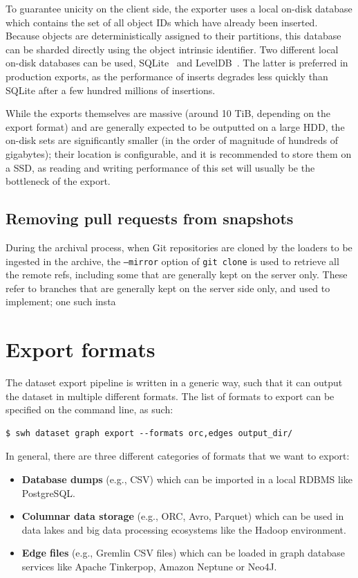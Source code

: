To guarantee unicity on the client side, the exporter uses a local on-disk
database which contains the set of all object IDs which have already been
inserted. Because objects are deterministically assigned to their partitions,
this database can be sharded directly using the object intrinsic identifier.
Two different local on-disk databases can be used,
SQLite~\cite{owens2006sqlitebook} and LevelDB~\cite{ghemawat2011leveldb}. The
latter is preferred in production exports, as the performance of inserts
degrades less quickly than SQLite after a few hundred millions of insertions.

While the exports themselves are massive (around 10 TiB, depending on the
export format) and are generally expected to be outputted on a large \gls{HDD},
the on-disk sets are significantly smaller (in the order of magnitude of
hundreds of gigabytes); their location is configurable, and it is recommended
to store them on a \gls{SSD}, as reading and writing performance of this set
will usually be the bottleneck of the export.

\subsection{Removing pull requests from snapshots}

During the archival process, when Git repositories are cloned by the loaders to
be ingested in the archive, the \texttt{--mirror} option of \texttt{git clone}
is used to retrieve all the remote refs, including some that are generally kept
on the server only. These refer to branches that are generally kept on the
server side only, and used to implement; one such insta

\section{Export formats}

The dataset export pipeline is written in a generic way, such that it can
output the dataset in multiple different formats. The list of formats to export
can be specified on the command line, as such:

\begin{verbatim}
$ swh dataset graph export --formats orc,edges output_dir/
\end{verbatim}

In general, there are three different categories of formats that we want to
export:

\begin{itemize}
    \item \textbf{Database dumps} (e.g., CSV) which can be imported in a local
        \gls{RDBMS} like PostgreSQL.
    \item \textbf{Columnar data storage} (e.g., ORC, Avro, Parquet) which can
        be used in data lakes and big data processing ecosystems like the
        Hadoop environment.
    \item \textbf{Edge files} (e.g., Gremlin CSV files) which can
        be loaded in graph database services like Apache Tinkerpop, Amazon
        Neptune or Neo4J.
\end{itemize}

